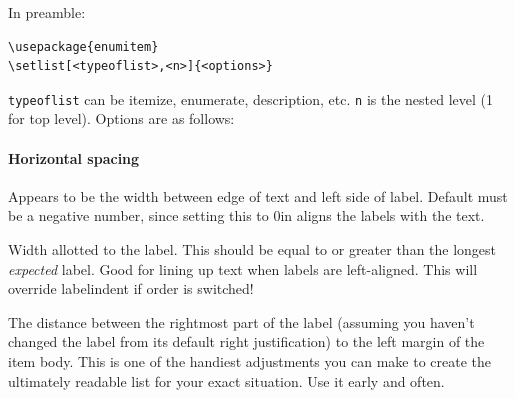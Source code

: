 \documentclass{article}
\begin{document}
In preamble:
\begin{verbatim}
\usepackage{enumitem}
\setlist[<typeoflist>,<n>]{<options>}
\end{verbatim}
\verb|typeoflist| can be itemize, enumerate, description, etc.
\verb|n| is the nested level (1 for top level). Options are as follows:

\paragraph{Horizontal spacing}
\begin{description}[labelindent=2cm, leftmargin=\labelindent,
        ]
    \item [labelindent] Appears to be the width between edge of text
        and left side of label. Default must be a negative number, since
        setting this to 0in aligns the labels with the text.
    \item [labelwidth]
        Width allotted to the label. This should be equal to or greater than
        the longest \emph{expected} label. Good for lining up text when labels
        are left-aligned. This will override labelindent if order is switched!
    \item [labelsep]
        The distance between the rightmost part of the label (assuming
        you haven't changed the label from its default right
        justification) to the left margin of the item body. This is
        one of the handiest adjustments you can make to create the
        ultimately readable list for your exact situation. Use it
        early and often.


\end{description}
\end{document}
